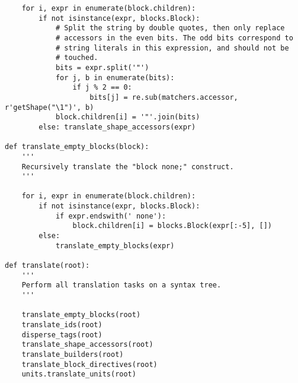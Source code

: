 \begin{lstlisting}
    for i, expr in enumerate(block.children):
        if not isinstance(expr, blocks.Block):
            # Split the string by double quotes, then only replace
            # accessors in the even bits. The odd bits correspond to
            # string literals in this expression, and should not be
            # touched.
            bits = expr.split('"')
            for j, b in enumerate(bits):
                if j % 2 == 0:
                    bits[j] = re.sub(matchers.accessor, r'getShape("\1")', b)
            block.children[i] = '"'.join(bits)
        else: translate_shape_accessors(expr)

def translate_empty_blocks(block):
    '''
    Recursively translate the "block none;" construct.
    '''

    for i, expr in enumerate(block.children):
        if not isinstance(expr, blocks.Block):
            if expr.endswith(' none'):
                block.children[i] = blocks.Block(expr[:-5], [])
        else:
            translate_empty_blocks(expr)

def translate(root):
    '''
    Perform all translation tasks on a syntax tree.
    '''

    translate_empty_blocks(root)
    translate_ids(root)
    disperse_tags(root)
    translate_shape_accessors(root)
    translate_builders(root)
    translate_block_directives(root)
    units.translate_units(root)
\end{lstlisting}

